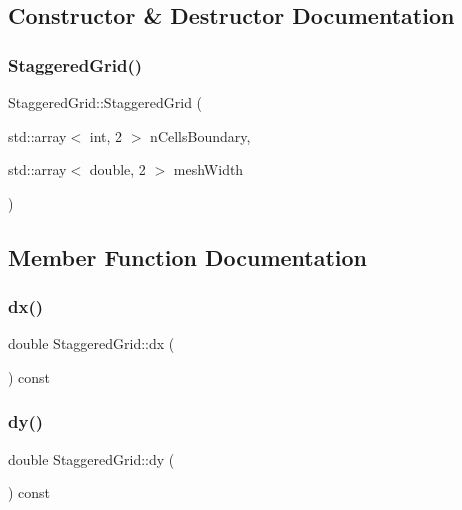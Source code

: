 \subsection{Constructor \& Destructor Documentation}
\mbox{\label{classStaggeredGrid_a2d170c6bbd8f7949ded93cdab769d18a}} 
\subsubsection{\texorpdfstring{StaggeredGrid()}{StaggeredGrid()}}
{\footnotesize\ttfamily Staggered\+Grid\+::\+Staggered\+Grid (\begin{DoxyParamCaption}\item[{std\+::array$<$ int, 2 $>$}]{n\+Cells\+Boundary,  }\item[{std\+::array$<$ double, 2 $>$}]{mesh\+Width }\end{DoxyParamCaption})}



\subsection{Member Function Documentation}
\mbox{\label{classStaggeredGrid_aec8490affea703cdd73b1febaed68968}} 
\subsubsection{\texorpdfstring{dx()}{dx()}}
{\footnotesize\ttfamily double Staggered\+Grid\+::dx (\begin{DoxyParamCaption}{ }\end{DoxyParamCaption}) const}

\mbox{\label{classStaggeredGrid_abde2da10e0c130fb0f206de64c9b4956}} 
\subsubsection{\texorpdfstring{dy()}{dy()}}
{\footnotesize\ttfamily double Staggered\+Grid\+::dy (\begin{DoxyParamCaption}{ }\end{DoxyParamCaption}) const}

